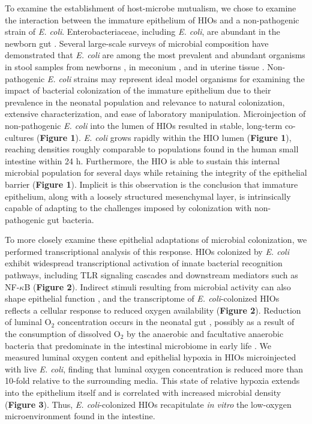 \documentclass[9pt,lineo]{elife}
\begin{document}
To examine the establishment of host-microbe mutualism, we chose to examine the interaction between the immature epithelium of HIOs and a non-pathogenic strain of \emph{E. coli}. Enterobacteriaceae, including \emph{E. coli}, are abundant in the newborn gut \citep{Palmer:2007,Koenig:2011,Backhed:2015,Yassour:2016}. Several large-scale surveys of microbial composition have demonstrated that \emph{E. coli} are among the most prevalent and abundant organisms in stool samples from newborns \citep{Backhed:2015,Koenig:2011}, in meconium \citep{Gosalbes:2013}, and in uterine tissue \citep{Aagaard:2014}. Non-pathogenic \emph{E. coli} strains may represent ideal model organisms for examining the impact of bacterial colonization of the immature epithelium due to their prevalence in the neonatal population and relevance to natural colonization, extensive characterization, and ease of laboratory manipulation. Microinjection of non-pathogenic \emph{E. coli} into the lumen of HIOs resulted in stable, long-term co-cultures (\textbf{Figure 1}). \emph{E. coli} grows rapidly within the HIO lumen (\textbf{Figure 1}), reaching densities roughly comparable to populations found in the human small intestine \citep{Donaldson:2016} within 24 h. Furthermore, the HIO is able to sustain this internal microbial population for several days while retaining the integrity of the epithelial barrier (\textbf{Figure 1}). Implicit is this observation is the conclusion that immature epithelium, along with a loosely structured mesenchymal layer, is intrinsically capable of adapting to the challenges imposed by colonization with non-pathogenic gut bacteria. 

To more closely examine these epithelial adaptations of microbial colonization, we performed transcriptional analysis of this response. HIOs colonized by \emph{E. coli} exhibit widespread transcriptional activation of innate bacterial recognition pathways, including TLR signaling cascades and downstream mediators such as NF-\(\kappa\)B (\textbf{Figure 2}). Indirect stimuli resulting from microbial activity can also shape epithelial function \citep{Buffie:2013}, and the transcriptome of \emph{E. coli}-colonized HIOs reflects a cellular response to reduced oxygen availability (\textbf{Figure 2}). Reduction of luminal O\(_{\text{2}}\) concentration occurs in the neonatal gut \citep{Gruette:1965,Fisher:2013,Zheng:2015}, possibly as a result of the consumption of dissolved O\(_{\text{2}}\) by the anaerobic and facultative anaerobic bacteria that predominate in the intestinal microbiome in early life \citep{Espey:2013,Fanaro:2003,Favier:2002,Palmer:2007}. We measured luminal oxygen content and epithelial hypoxia in HIOs microinjected with live \emph{E. coli}, finding that luminal oxygen concentration is reduced more than 10-fold relative to the surrounding media. This state of relative hypoxia extends into the epithelium itself and is correlated with increased microbial density (\textbf{Figure 3}). Thus, \emph{E. coli}-colonized HIOs recapitulate \emph{in vitro} the low-oxygen microenvironment found in the intestine.
\end{document}
